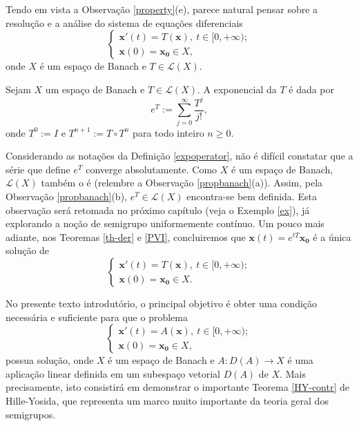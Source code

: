 Tendo em vista a Observação \ref{property}(e), parece natural pensar sobre a resolução e a análise do sistema de equações diferenciais
\[
\begin{cases}
    \mathbf{x'}(t)=T(\mathbf{x}),\ t\in [0,+\infty);\\
    \mathbf{x}(0)=\mathbf{x_0} \in X,
\end{cases}
\]
onde $X$ é um espaço de Banach e $T\in \mathcal L (X)$.

\begin{definition}\label{expoperator}
    Sejam $X$ um espaço de Banach e $T\in \mathcal L (X)$. A exponencial da $T$ é dada por
    \begin{equation}\label{expt}
    \displaystyle e^{T}:=\sum_{j=0}^{\infty} \frac{T^j}{j!},
    \end{equation}
    onde $T^0:=I$ e $T^{n+1} := T\circ T^{n}$ para todo inteiro $n\geq 0$.
\end{definition}

\begin{remark}
Considerando as notações da Definição \ref{expoperator}, não é difícil constatar que a série que define $e^{T}$ converge absolutamente.  Como $X$ é um espaço de Banach, $\mathcal L(X)$ também o é (relembre a Observação \ref{propbanach}(a)). Assim, pela Observação \ref{propbanach}(b), $e^{T}\in \mathcal{L}(X)$ encontra-se bem definida. Esta observação será retomada no próximo capítulo (veja o Exemplo \ref{ex}), já explorando a noção de semigrupo uniformemente contínuo. Um pouco mais adiante, nos Teoremas \ref{th-der} e \ref{PVI}, concluiremos que $\mathbf{x} (t)=e^{tT} \mathbf{x_0}$ é a única solução de
\[
\begin{cases}
    \mathbf{x'}(t)=T(\mathbf{x}),\ t\in [0,+\infty);\\
    \mathbf{x}(0)=\mathbf{x_0} \in X.
\end{cases}
\]
\end{remark}

No presente texto introdutório, o principal objetivo é obter uma condição necessária e suficiente para que o problema
\[
\begin{cases}
    \mathbf{x'}(t)=A(\mathbf{x}),\ t\in [0,+\infty);\\
    \mathbf{x}(0)=\mathbf{x_0} \in X,
\end{cases}
\]
possua solução, onde $X$ é um espaço de Banach e $A:D(A)\longrightarrow X$ é uma aplicação linear definida em um subespaço vetorial $D(A)$ de $X$. Mais precisamente, isto consistirá em demonstrar o importante Teorema \ref{HY-contr} de Hille-Yosida, que representa um marco muito importante da teoria geral dos semigrupos.



